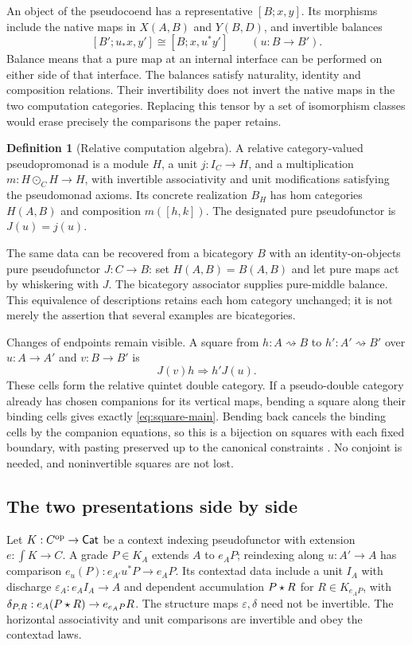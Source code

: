 \documentclass[11pt]{article}
\numberwithin{equation}{section}
\theoremstyle{definition}\newtheorem{definition}[theorem]{Definition}
\begin{document}
An object of the pseudocoend has a representative $[B;x,y]$. Its morphisms
include the native maps in $X(A,B)$ and $Y(B,D)$, and invertible balances
\[
 [B';u_*x,y']\cong[B;x,u^*y']\qquad(u:B\to B').
\]
Balance means that a pure map at an internal interface can be performed on
either side of that interface. The balances satisfy naturality, identity and
composition relations. Their invertibility does not invert the native maps
in the two computation categories. Replacing this tensor by a set of
isomorphism classes would erase precisely the comparisons the paper retains.

\begin{definition}[Relative computation algebra]\label{def:relative-main}
A relative category-valued pseudopromonad is a module $H$, a unit
$j:I_C\to H$, and a multiplication $m:H\odot_CH\to H$, with invertible
associativity and unit modifications satisfying the pseudomonad axioms.
Its concrete realization $B_H$ has hom categories $H(A,B)$ and composition
$m([h,k])$. The designated pure pseudofunctor is $J(u)=j(u)$.
\end{definition}
The same data can be recovered from a bicategory $B$ with an
identity-on-objects pure pseudofunctor $J:C\to B$: set
$H(A,B)=B(A,B)$ and let pure maps act by whiskering with $J$.
The bicategory associator supplies pure-middle balance. This equivalence of
descriptions retains each hom category unchanged; it is not merely the
assertion that several examples are bicategories.

Changes of endpoints remain visible. A square from $h:A\rightsquigarrow B$
to $h':A'\rightsquigarrow B'$ over $u:A\to A'$ and $v:B\to B'$ is
\begin{equation}\label{eq:square-main}
                   J(v)h\Longrightarrow h'J(u).
\end{equation}
These cells form the relative quintet double category. If a pseudo-double
category already has chosen companions for its vertical maps, bending a
square along their binding cells gives exactly \eqref{eq:square-main}.
Bending back cancels the binding cells by the companion equations, so this
is a bijection on squares with each fixed boundary, with pasting preserved
up to the canonical constraints \cite[Sec.~3]{U}. No conjoint is needed,
and noninvertible squares are not lost.

\subsection{The two presentations side by side}\label{sec:presentations-main}
Let $K:C^{\mathrm{op}}\to\mathsf{Cat}$ be a context indexing pseudofunctor with extension
$e:\int K\to C$. A grade $P\in K_A$ extends $A$ to $e_AP$; reindexing
along $u:A'\to A$ has comparison $e_u(P):e_{A'}u^*P\to e_AP$.
Its contextad data include a unit $I_A$ with discharge
$\varepsilon_A:e_AI_A\to A$ and dependent accumulation $P\mathbin{\star} R$
for $R\in K_{e_AP}$, with
$\delta_{P,R}:e_A(P\mathbin{\star} R)\to e_{e_AP}R$.
The structure maps $\varepsilon,\delta$ need not be invertible. The
horizontal associativity and unit comparisons are invertible and obey the
contextad laws.
\end{document}
